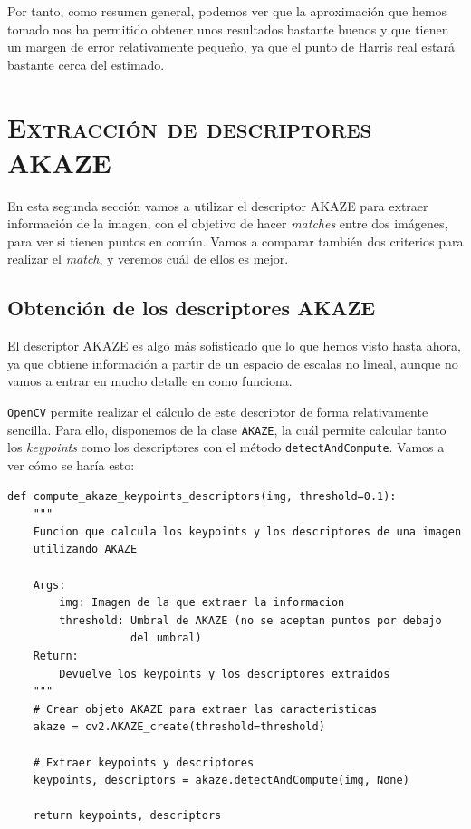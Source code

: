 \documentclass[11pt,a4paper]{article}
\begin{document}
Por tanto, como resumen general, podemos ver que la aproximación que
hemos tomado nos ha permitido obtener unos resultados bastante buenos
y que tienen un margen de error relativamente pequeño, ya que el punto de
Harris real estará bastante cerca del estimado.

\section{\textsc{Extracción de descriptores AKAZE}}

En esta segunda sección vamos a utilizar el descriptor AKAZE para
extraer información de la imagen, con el objetivo de hacer \textit{matches}
entre dos imágenes, para ver si tienen puntos en común. Vamos a comparar
también dos criterios para realizar el  \textit{match}, y veremos cuál de ellos
es mejor.

\subsection{Obtención de los descriptores AKAZE}

El descriptor AKAZE es algo más sofisticado que lo que hemos visto hasta ahora, ya
que obtiene información a partir de un espacio de escalas no lineal, aunque no
vamos a entrar en mucho detalle en como funciona.

\texttt{OpenCV} permite realizar el cálculo de este descriptor de forma relativamente
sencilla. Para ello, disponemos de la clase \texttt{AKAZE}, la cuál permite calcular tanto
los \textit{keypoints} como los descriptores con el método \texttt{detectAndCompute}.
Vamos a ver cómo se haría esto:

\begin{lstlisting}
def compute_akaze_keypoints_descriptors(img, threshold=0.1):
    """
    Funcion que calcula los keypoints y los descriptores de una imagen
    utilizando AKAZE

    Args:
        img: Imagen de la que extraer la informacion
        threshold: Umbral de AKAZE (no se aceptan puntos por debajo
                   del umbral)
    Return:
        Devuelve los keypoints y los descriptores extraidos
    """
    # Crear objeto AKAZE para extraer las caracteristicas
    akaze = cv2.AKAZE_create(threshold=threshold)

    # Extraer keypoints y descriptores
    keypoints, descriptors = akaze.detectAndCompute(img, None)

    return keypoints, descriptors
\end{lstlisting}
\end{document}
